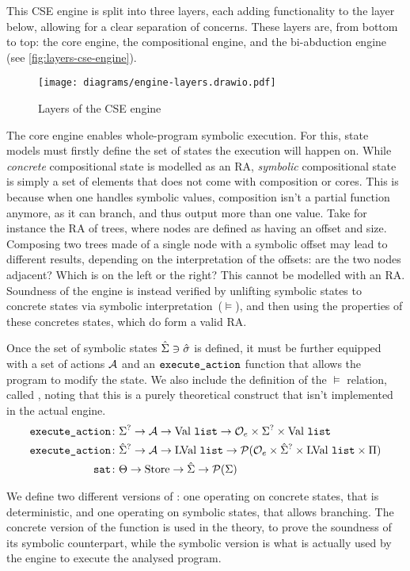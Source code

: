 This CSE engine is split into three layers, each adding functionality to the layer below, allowing for a clear separation of concerns. These layers are, from bottom to top: the core engine, the compositional engine, and the bi-abduction engine (see \autoref{fig:layers-cse-engine}).

\begin{figure}
	\centering
	\texttt{[image: diagrams/engine-layers.drawio.pdf]}
	\caption{Layers of the CSE engine}
	\label{fig:layers-cse-engine}
\end{figure}

The core engine enables whole-program symbolic execution. For this, state models must firstly define the set of states the execution will happen on. While \emph{concrete} compositional state is modelled as an RA, \emph{symbolic} compositional state is simply a set of elements that does not come with composition or cores. This is because when one handles symbolic values, composition isn't a partial function anymore, as it can branch, and thus output more than one value. Take for instance the RA of trees, where nodes are defined as having an offset and size. Composing two trees made of a single node with a symbolic offset may lead to different results, depending on the interpretation of the offsets: are the two nodes adjacent? Which is on the left or the right? This cannot be modelled with an RA. Soundness of the engine is instead verified by unlifting symbolic states to concrete states via symbolic interpretation~($\models$), and then using the properties of these concretes states, which do form a valid RA.

Once the set of symbolic states $\hat{\Sigma}\ni\hat{\sigma}$ is defined, it must be further equipped with a set of actions ${\cal{A}}$ and an $\texttt{execute\_action}$ function that allows the program to modify the state. We also include the definition of the $\models$ relation, called , noting that this is a purely theoretical construct that isn't implemented in the actual engine.
\begin{align*}
	\texttt{execute\_action} &\colon \Sigma^? \rightarrow {\ensuremath{\cal{A}}} \rightarrow \text{Val}~\texttt{list} \rightarrow {\cal O}_e \times \Sigma^? \times \text{Val}~\texttt{list}\\
	\texttt{execute\_action} &\colon \hat{\Sigma}^? \rightarrow {\ensuremath{\cal{A}}} \rightarrow \text{LVal}~\texttt{list} \rightarrow {\cal P}({\cal O}_e \times \hat{\Sigma}^? \times \text{LVal}~\texttt{list} \times \Pi) \\
	\texttt{sat} &\colon \Theta \rightarrow \text{Store} \rightarrow \hat{\Sigma} \rightarrow {\cal P}(\Sigma)
\end{align*}

We define two different versions of \execac{}: one operating on concrete states, that is deterministic, and one operating on symbolic states, that allows branching. The concrete version of the function is used in the theory, to prove the soundness of its symbolic counterpart, while the symbolic version is what is actually used by the engine to execute the analysed program.

